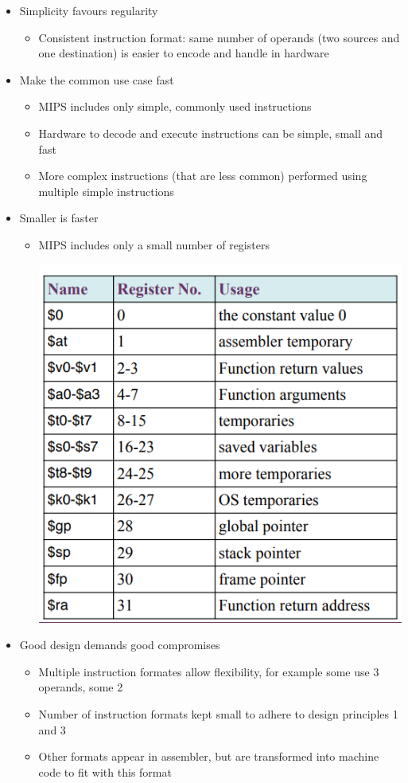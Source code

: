 \documentclass{article}[18pt]
\begin{document}
\begin{itemize}
	\item Simplicity favours regularity
	\begin{itemize}
		\item Consistent instruction format: same number of operands (two sources and one destination) is easier to encode and handle in hardware
	\end{itemize}
	\item Make the common use case fast
	\begin{itemize}
		\item MIPS includes only simple, commonly used instructions
		\item Hardware to decode and execute instructions can be simple, small and fast
		\item More complex instructions (that are less common) performed using multiple simple instructions
	\end{itemize}
	\item Smaller is faster
	\begin{itemize}
		\item MIPS includes only a small number of registers
		\begin{center}
			\includegraphics[scale=0.5]{register}
		\end{center}
	\end{itemize}
	\item Good design demands good compromises
	\begin{itemize}
		\item Multiple instruction formates allow flexibility, for example some use 3 operands, some 2
		\item Number of instruction formats kept small to adhere to design principles 1 and 3
		\item Other formats appear in assembler, but are transformed into machine code to fit with this format
	\end{itemize} 
\end{itemize}
\end{document}
